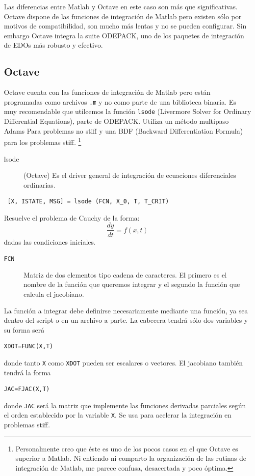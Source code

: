 Las diferencias entre Matlab y Octave en este caso son más que significativas.
Octave dispone de las funciones de integración de Matlab pero existen
sólo por motivos de compatibilidad, son mucho más lentas y no se pueden
configurar. Sin embargo Octave integra la suite ODEPACK,
uno de los paquetes de integración de EDOs más robusto y efectivo.


\subsection{Octave}

Octave cuenta con las funciones de integración de Matlab pero están
programadas como archivos \texttt{.m} y no como parte de una
biblioteca binaria. Es muy recomendable que utilcemos la función
\texttt{lsode} (Livermore Solver for Ordinary Differential Equations),
parte de ODEPACK.  Utiliza un método multipaso Adams Para problemas no
stiff y una BDF (Backward Differentiation Formula) para los
problemas stiff.%
\footnote{Personalmente creo que éste es uno de los pocos casos en el
  que Octave es superior a Matlab. Ni entiendo ni comparto la
  organización de las rutinas de integración de Matlab, me parece
  confusa, desacertada y poco óptima.%
}

\begin{description}
\item [lsode](Octave) Es el driver general de integración
  de ecuaciones diferenciales ordinarias.
\end{description}
\begin{verbatim} [X, ISTATE, MSG] = lsode (FCN, X_0, T, T_CRIT)
\end{verbatim}
Resuelve el problema de Cauchy de la forma:
$$ \frac{dy}{dt}=f(x,t)$$
dadas las condiciones iniciales.

\begin{description}
\item [\texttt{FCN}]Matriz de dos elementos tipo cadena de caracteres.
  El primero es el nombre de la función que queremos integrar y el
  segundo la función que calcula el jacobiano.
\end{description}
La función a integrar debe definirse necesariamente mediante una
función, ya sea dentro del script o en un archivo a parte. La cabecera
tendrá sólo dos variables y su forma será

\begin{verbatim}
XDOT=FUNC(X,T)
\end{verbatim}
donde tanto \texttt{X} como \texttt{XDOT} pueden ser escalares o
vectores.  El jacobiano también tendrá la forma
\begin{verbatim}
JAC=FJAC(X,T)
\end{verbatim}
donde \texttt{JAC} será la matriz que implemente las funciones
derivadas parciales según el orden establecido por la variable
\texttt{X}. Se usa para acelerar la integración en problemas stiff.

